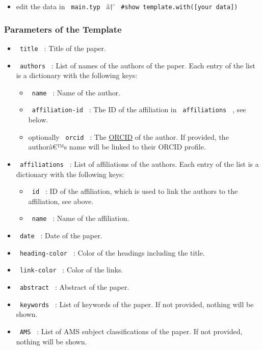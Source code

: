 \begin{Shaded}
\begin{Highlighting}[]
\end{Highlighting}
\end{Shaded}

\begin{itemize}
\tightlist
\item
  edit the data in \texttt{\ main.typ\ } â†'
  \texttt{\ \#show\ template.with({[}your\ data{]})\ }
\end{itemize}

\subsubsection{Parameters of the
Template}\label{parameters-of-the-template}

\begin{itemize}
\tightlist
\item
  \texttt{\ title\ } : Title of the paper.
\item
  \texttt{\ authors\ } : List of names of the authors of the paper. Each
  entry of the list is a dictionary with the following keys:

  \begin{itemize}
  \tightlist
  \item
    \texttt{\ name\ } : Name of the author.
  \item
    \texttt{\ affiliation-id\ } : The ID of the affiliation in
    \texttt{\ affiliations\ } , see below.
  \item
    optionally \texttt{\ orcid\ } : The \href{https://orcid.org/}{ORCID}
    of the author. If provided, the authorâ€™s name will be linked to
    their ORCID profile.
  \end{itemize}
\item
  \texttt{\ affiliations\ } : List of affiliations of the authors. Each
  entry of the list is a dictionary with the following keys:

  \begin{itemize}
  \tightlist
  \item
    \texttt{\ id\ } : ID of the affiliation, which is used to link the
    authors to the affiliation, see above.
  \item
    \texttt{\ name\ } : Name of the affiliation.
  \end{itemize}
\item
  \texttt{\ date\ } : Date of the paper.
\item
  \texttt{\ heading-color\ } : Color of the headings including the
  title.
\item
  \texttt{\ link-color\ } : Color of the links.
\item
  \texttt{\ abstract\ } : Abstract of the paper.
\item
  \texttt{\ keywords\ } : List of keywords of the paper. If not
  provided, nothing will be shown.
\item
  \texttt{\ AMS\ } : List of AMS subject classifications of the paper.
  If not provided, nothing will be shown.
\end{itemize}

